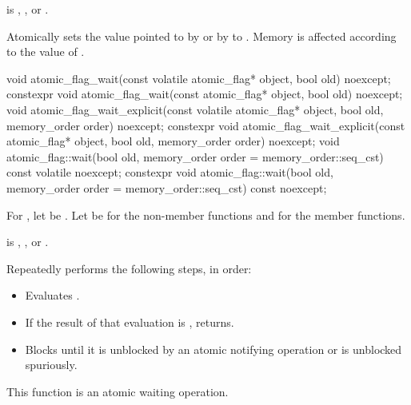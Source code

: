 \begin{itemdescr}
\pnum
\expects
{} is
,
, or
.

\pnum
\effects
Atomically sets the value pointed to by  or by  to
. Memory is affected according to the value of .
\end{itemdescr}

%
%
%
\begin{itemdecl}
void atomic_flag_wait(const volatile atomic_flag* object, bool old) noexcept;
constexpr void atomic_flag_wait(const atomic_flag* object, bool old) noexcept;
void atomic_flag_wait_explicit(const volatile atomic_flag* object,
                               bool old, memory_order order) noexcept;
constexpr void atomic_flag_wait_explicit(const atomic_flag* object,
                               bool old, memory_order order) noexcept;
void atomic_flag::wait(bool old, memory_order order =
                                   memory_order::seq_cst) const volatile noexcept;
constexpr void atomic_flag::wait(bool old, memory_order order =
                                   memory_order::seq_cst) const noexcept;
\end{itemdecl}

\begin{itemdescr}
\pnum
For ,
let  be .
Let  be  for the non-member functions and
 for the member functions.

\pnum
\expects
{} is
,
, or
.

\pnum
\effects
Repeatedly performs the following steps, in order:
\begin{itemize}
\item
  Evaluates .
\item
  If the result of that evaluation is , returns.
\item
  Blocks until it
  is unblocked by an atomic notifying operation or is unblocked spuriously.
\end{itemize}

\pnum
\remarks
This function is an atomic waiting operation.
\end{itemdescr}

